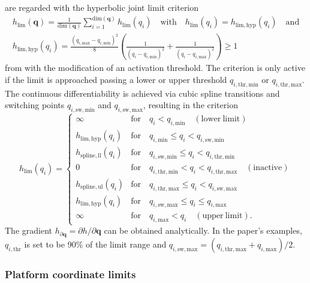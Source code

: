 \documentclass[runningheads]{llncs}
\newcommand{\bm}[1]{\boldsymbol{#1}}
\begin{document}
are regarded with the hyperbolic joint limit criterion 
%
\begin{align}
h_{\mathrm{lim}}(\bm{q})
=
\frac{1}{\mathrm{dim}(\bm{q})}
\sum_{i=1}^{\mathrm{dim}(\bm{q})}
h_{\mathrm{lim}}(q_i) 
\quad \mathrm{with} \quad
h_{\mathrm{lim}}(q_i) =h_{\mathrm{lim,hyp}}(q_i) 
 \quad \mathrm{and}
\\
h_{\mathrm{lim,hyp}}(q_i) 
=
\frac{(q_{i,\mathrm{max}}{-}q_{i,\mathrm{min}})^2}{8}
\left(
\frac{1}{(q_{i}{-}q_{i,\mathrm{min}})^2}
+
\frac{1}{(q_{i}{-}q_{i,\mathrm{max}})^2}
\right)
\ge 1
\label{equ:hlim_hyp}
\end{align}
%
from \cite{ZhuQuCaoYan2013} with the modification of an activation threshold.
The criterion is only active if the limit is approached passing a lower or upper threshold $q_{i,\mathrm{thr,min}}$ or $q_{i,\mathrm{thr,max}}$.
The continuous differentiability is achieved via cubic spline transitions and switching points $q_{i,\mathrm{sw,min}}$ and $q_{i,\mathrm{sw,max}}$, resulting in the criterion
%
\begin{equation}
h_{\mathrm{lim}}(q_i)
=
\begin{cases} 
\infty & \mathrm{for} \quad q_i < q_{i,\mathrm{min}} \quad \mathrm{(lower~limit)} \\
h_{\mathrm{lim,hyp}}(q_i) & \mathrm{for} \quad q_{i,\mathrm{min}} \leq q_i < q_{i,\mathrm{sw,min}} \\
h_{\mathrm{spline,ll}}(q_i) & \mathrm{for} \quad q_{i,\mathrm{sw,min}} \leq q_i < q_{i,\mathrm{thr,min}} \\
0 & \mathrm{for} \quad q_{i,\mathrm{thr,min}} < q_i < q_{i,\mathrm{thr,max}} \quad \mathrm{(inactive)}\\
h_{\mathrm{spline,ul}}(q_i) & \mathrm{for} \quad q_{i,\mathrm{thr,max}} \leq q_i < q_{i,\mathrm{sw,max}} \\
h_{\mathrm{lim,hyp}}(q_i) & \mathrm{for} \quad q_{i,\mathrm{sw,max}} \leq q_i \leq q_{i,\mathrm{max}} \\
\infty & \mathrm{for} \quad  q_{i,\mathrm{max}} < q_i \quad \mathrm{(upper~limit)}.
\end{cases}
\label{equ:hlim_dist_pw}
\end{equation}
%
The gradient $h_{\partial \bm{q}} = \partial h / \partial \bm{q}$ can be obtained analytically.
In the paper's examples, $q_{i,\mathrm{thr}}$ is set to be 90\% of the limit range and $q_{i,\mathrm{sw,max}}=(q_{i,\mathrm{thr,max}}+q_{i,\mathrm{max}})/2$.

\subsubsection{Platform coordinate limits}
\end{document}

